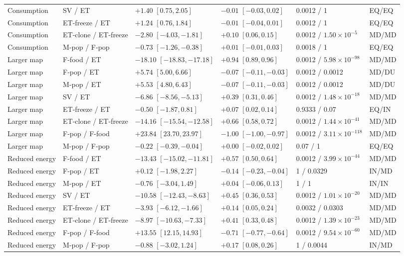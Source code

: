 {\begin{longtable}{P{2.1cm}P{2.1cm}P{2.75cm}P{2.65cm}P{2.4cm}P{1.4cm}}
Consumption & SV / ET & $+1.40$ $[0.75,2.05]$ & $-0.01$ $[-0.03,0.02]$ & 0.0012 / 1 & EQ/EQ\\
Consumption & ET-freeze / ET & $+1.24$ $[0.76,1.84]$ & $-0.01$ $[-0.04,0.01]$ & 0.0012 / 1 & EQ/EQ\\
Consumption & ET-clone / ET-freeze & $-2.80$ $[-4.03,-1.81]$ & $+0.10$ $[0.06,0.15]$ & 0.0012 / $1.50\times10^{-5}$ & MD/MD\\
Consumption & M-pop / F-pop & $-0.73$ $[-1.26,-0.38]$ & $+0.01$ $[-0.01,0.03]$ & 0.0018 / 1 & EQ/EQ\\
Larger map & F-food / ET & $-18.10$ $[-18.83,-17.18]$ & $+0.94$ $[0.89,0.96]$ & 0.0012 / $5.98\times10^{-98}$ & MD/MD\\
Larger map & F-pop / ET & $+5.74$ $[5.00,6.66]$ & $-0.07$ $[-0.11,-0.03]$ & 0.0012 / 0.0012 & MD/DU\\
Larger map & M-pop / ET & $+5.53$ $[4.80,6.43]$ & $-0.07$ $[-0.11,-0.03]$ & 0.0012 / 0.0012 & MD/DU\\
Larger map & SV / ET & $-6.86$ $[-8.56,-5.13]$ & $+0.39$ $[0.31,0.46]$ & 0.0012 / $1.48\times10^{-18}$ & MD/MD\\
Larger map & ET-freeze / ET & $-0.50$ $[-1.87,0.81]$ & $+0.07$ $[0.02,0.14]$ & 0.9333 / 0.07 & EQ/IN\\
Larger map & ET-clone / ET-freeze & $-14.16$ $[-15.54,-12.58]$ & $+0.66$ $[0.58,0.72]$ & 0.0012 / $1.44\times10^{-41}$ & MD/MD\\
Larger map & F-pop / F-food & $+23.84$ $[23.70,23.97]$ & $-1.00$ $[-1.00,-0.97]$ & 0.0012 / $3.11\times10^{-118}$ & MD/MD\\
Larger map & M-pop / F-pop & $-0.22$ $[-0.39,-0.04]$ & $+0.00$ $[-0.02,0.02]$ & 0.07 / 1 & EQ/EQ\\
Reduced energy & F-food / ET & $-13.43$ $[-15.02,-11.81]$ & $+0.57$ $[0.50,0.64]$ & 0.0012 / $3.99\times10^{-44}$ & MD/MD\\
Reduced energy & F-pop / ET & $+0.12$ $[-1.98,2.27]$ & $-0.14$ $[-0.23,-0.04]$ & 1 / 0.0329 & IN/MD\\
Reduced energy & M-pop / ET & $-0.76$ $[-3.04,1.49]$ & $+0.04$ $[-0.06,0.13]$ & 1 / 1 & IN/IN\\
Reduced energy & SV / ET & $-10.58$ $[-12.43,-8.63]$ & $+0.45$ $[0.36,0.53]$ & 0.0012 / $1.01\times10^{-20}$ & MD/MD\\
Reduced energy & ET-freeze / ET & $-3.93$ $[-6.12,-1.66]$ & $+0.14$ $[0.05,0.24]$ & 0.0032 / 0.0303 & MD/MD\\
Reduced energy & ET-clone / ET-freeze & $-8.97$ $[-10.63,-7.33]$ & $+0.41$ $[0.33,0.48]$ & 0.0012 / $1.39\times10^{-23}$ & MD/MD\\
Reduced energy & F-pop / F-food & $+13.55$ $[12.15,14.93]$ & $-0.71$ $[-0.77,-0.64]$ & 0.0012 / $9.54\times10^{-60}$ & MD/MD\\
Reduced energy & M-pop / F-pop & $-0.88$ $[-3.02,1.24]$ & $+0.17$ $[0.08,0.26]$ & 1 / 0.0044 & IN/MD\\
\end{longtable}
}
